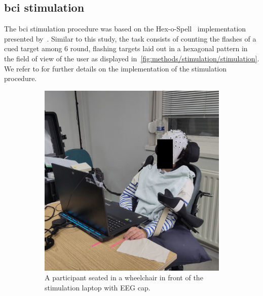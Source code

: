 \documentclass[twocolumn]{article}
\begin{document}
\subsection{\Acs{bci} stimulation}

The \ac{bci} stimulation procedure was based on the
Hex-o-Spell~\cite{Treder2010} implementation presented
by~\textcite{VanDenKerchove2024}.
Similar to this study, the task consists of counting the flashes of a cued
target among 6 round, flashing targets laid out in a hexagonal pattern in the
field of view of the user as displayed
in~\cref{fig:methods/stimulation/stimulation}.
We refer to \textcite{VanDenKerchove2024} for further details on the implementation
of the stimulation procedure.
\begin{figure}[t]
  \centering
  \begin{subfigure}[b]{.41\textwidth}
    \includegraphics[width=\textwidth]{figures/PD01b-obfuscated.jpg}
    \caption{A participant seated in a wheelchair in front of the stimulation laptop with EEG
    cap.}
  \end{subfigure}\hfill%
  \begin{minipage}[b]{.54\textwidth}
    \begin{subfigure}[b]{.45\linewidth}

\end{subfigure}
\end{minipage}
\end{figure}
\end{document}
